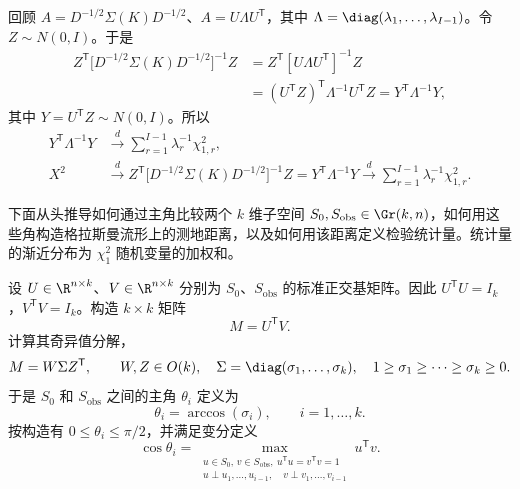 回顾 $A=D^{-1/2}\Sigma(K)D^{-1/2}$、$A=U\Lambda U^{\mathsf T}$，其中 $\Lambda=\diag(\lambda_1,\ldots,\lambda_{I-1})$。令 $Z\sim N(0,I)$。于是
\begin{equation*}
  \begin{aligned}
    Z^{\mathsf T}\bigl[D^{-1/2}\Sigma(K)D^{-1/2}\bigr]^{-1}Z
      &=Z^{\mathsf T}[U\Lambda U^{\mathsf T}]^{-1}Z\\
      &=(U^{\mathsf T}Z)^{\mathsf T}\Lambda^{-1}U^{\mathsf T}Z
       =Y^{\mathsf T}\Lambda^{-1}Y,
  \end{aligned}
  \tag{6H4}\label{eq:6H4}
\end{equation*}
其中 $Y=U^{\mathsf T}Z\sim N(0,I)$。所以
\begin{equation*}
  \begin{aligned}
    Y^{\mathsf T}\Lambda^{-1}Y
       &\xrightarrow{d}\sum_{r=1}^{I-1}\lambda_r^{-1}\chi_{1,r}^2,\\
    X^2&\xrightarrow{d}Z^{\mathsf T}\bigl[D^{-1/2}\Sigma(K)D^{-1/2}\bigr]^{-1}Z
       =Y^{\mathsf T}\Lambda^{-1}Y
       \xrightarrow{d}\sum_{r=1}^{I-1}\lambda_r^{-1}\chi_{1,r}^2.
  \end{aligned}
  \tag{6H5}\label{eq:6H5}
\end{equation*}


下面从头推导如何通过主角比较两个 $k$ 维子空间 $S_0,S_{\mathrm{obs}}\in\Gr(k,n)$，如何用这些角构造格拉斯曼流形上的测地距离，以及如何用该距离定义检验统计量。统计量的渐近分布为 $\chi_1^2$ 随机变量的加权和。


设 $U\in\R^{n\times k}$、$V\in\R^{n\times k}$ 分别为 $S_0$、$S_{\mathrm{obs}}$ 的标准正交基矩阵。因此 $U^{\mathsf T}U=I_k$，$V^{\mathsf T}V=I_k$。构造 $k\times k$ 矩阵
\[
  M=U^{\mathsf T}V.
\]
计算其奇异值分解，
\[
  M=W\Sigma Z^{\mathsf T},\qquad W,Z\in O(k),\quad
  \Sigma=\diag(\sigma_1,\ldots,\sigma_k),\quad
  1\geq\sigma_1\geq\cdots\geq\sigma_k\geq0.
\]
于是 $S_0$ 和 $S_{\mathrm{obs}}$ 之间的主角 $\theta_i$ 定义为
\[
  \theta_i=\arccos(\sigma_i),\qquad i=1,\ldots,k.
\]
按构造有 $0\leq\theta_i\leq\pi/2$，并满足变分定义
\[
  \cos\theta_i=\max_{\substack{u\in S_0,\,v\in S_{\mathrm{obs}},\
                  u^{\mathsf T}u=v^{\mathsf T}v=1\\
                  u\perp u_1,\ldots,u_{i-1},\quad v\perp v_1,\ldots,v_{i-1}}}
                   u^{\mathsf T}v.
\]

